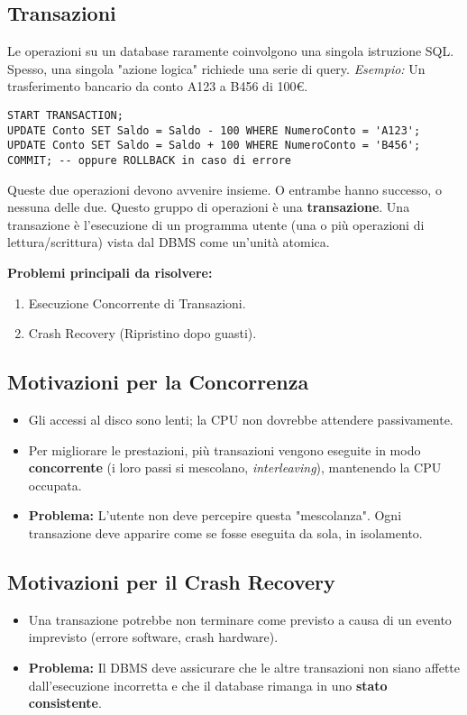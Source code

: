 \subsection{Transazioni}
Le operazioni su un database raramente coinvolgono una singola istruzione SQL. Spesso, una singola "azione logica" richiede una serie di query.
\textit{Esempio:} Un trasferimento bancario da conto A123 a B456 di 100€.
\begin{verbatim}
START TRANSACTION;
UPDATE Conto SET Saldo = Saldo - 100 WHERE NumeroConto = 'A123';
UPDATE Conto SET Saldo = Saldo + 100 WHERE NumeroConto = 'B456';
COMMIT; -- oppure ROLLBACK in caso di errore
\end{verbatim}
Queste due operazioni devono avvenire insieme. O entrambe hanno successo, o nessuna delle due. Questo gruppo di operazioni è una \textbf{transazione}. Una transazione è l'esecuzione di un programma utente (una o più operazioni di lettura/scrittura) vista dal DBMS come un'unità atomica.

\textbf{Problemi principali da risolvere:}
\begin{enumerate}
    \item Esecuzione Concorrente di Transazioni.
    \item Crash Recovery (Ripristino dopo guasti).
\end{enumerate}

\subsection{Motivazioni per la Concorrenza}
\begin{itemize}
    \item Gli accessi al disco sono lenti; la CPU non dovrebbe attendere passivamente.
    \item Per migliorare le prestazioni, più transazioni vengono eseguite in modo \textbf{concorrente} (i loro passi si mescolano, \textit{interleaving}), mantenendo la CPU occupata.
    \item \textbf{Problema:} L'utente non deve percepire questa "mescolanza". Ogni transazione deve apparire come se fosse eseguita da sola, in isolamento.
\end{itemize}

\subsection{Motivazioni per il Crash Recovery}
\begin{itemize}
    \item Una transazione potrebbe non terminare come previsto a causa di un evento imprevisto (errore software, crash hardware).
    \item \textbf{Problema:} Il DBMS deve assicurare che le altre transazioni non siano affette dall'esecuzione incorretta e che il database rimanga in uno \textbf{stato consistente}.
\end{itemize}

